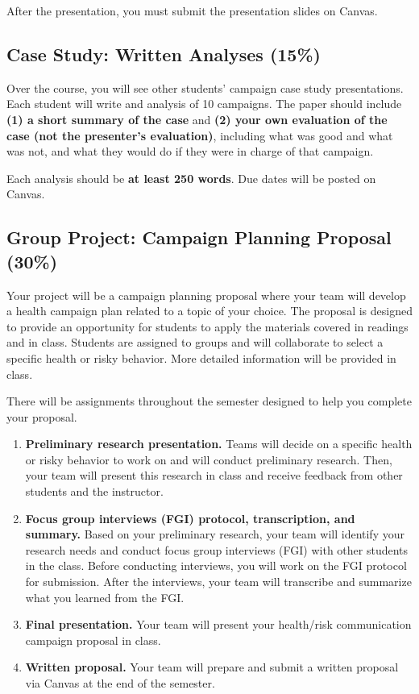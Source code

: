 \documentclass[
  letterpaper,
]{article}
\begin{document}
After the presentation, you must submit the presentation slides on
Canvas.

\hypertarget{case-study-written-analyses-15}{%
\subsection{Case Study: Written Analyses
(15\%)}\label{case-study-written-analyses-15}}

Over the course, you will see other students' campaign case study
presentations. Each student will write and analysis of 10 campaigns. The
paper should include \textbf{(1) a short summary of the case} and
\textbf{(2) your own evaluation of the case (not the presenter's
evaluation)}, including what was good and what was not, and what they
would do if they were in charge of that campaign.

Each analysis should be \textbf{at least 250 words}. Due dates will be
posted on Canvas.

\hypertarget{group-project-campaign-planning-proposal-30}{%
\subsection{Group Project: Campaign Planning Proposal
(30\%)}\label{group-project-campaign-planning-proposal-30}}

Your project will be a campaign planning proposal where your team will
develop a health campaign plan related to a topic of your choice. The
proposal is designed to provide an opportunity for students to apply the
materials covered in readings and in class. Students are assigned to
groups and will collaborate to select a specific health or risky
behavior. More detailed information will be provided in class.

There will be assignments throughout the semester designed to help you
complete your proposal.

\begin{enumerate}
\def\labelenumi{\arabic{enumi})}
\item
  \textbf{Preliminary research presentation.} Teams will decide on a
  specific health or risky behavior to work on and will conduct
  preliminary research. Then, your team will present this research in
  class and receive feedback from other students and the instructor.
\item
  \textbf{Focus group interviews (FGI) protocol, transcription, and
  summary.} Based on your preliminary research, your team will identify
  your research needs and conduct focus group interviews (FGI) with
  other students in the class. Before conducting interviews, you will
  work on the FGI protocol for submission. After the interviews, your
  team will transcribe and summarize what you learned from the FGI.
\item
  \textbf{Final presentation.} Your team will present your health/risk
  communication campaign proposal in class.
\item
  \textbf{Written proposal.} Your team will prepare and submit a written
  proposal via Canvas at the end of the semester.
\end{enumerate}
\end{document}
